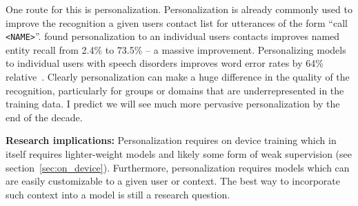 One route for this is personalization. Personalization is already commonly used
to improve the recognition a given users contact list for utterances of the
form ``call \texttt{<NAME>}''. \citet{sim2019personalization} found
personalization to an individual users contacts improves named entity recall
from 2.4\% to 73.5\% -- a massive improvement. Personalizing models to
individual users with speech disorders improves word error rates by 64\%
relative~\citep{sim2019investigation}. Clearly personalization can make a huge
difference in the quality of the recognition, particularly for groups or
domains that are underrepresented in the training data. I predict we will see
much more pervasive personalization by the end of the decade.

{\bf Research implications:} Personalization requires on device training which
in itself requires lighter-weight models and likely some form of weak
supervision (see section~\ref{sec:on_device}). Furthermore, personalization
requires models which can are easily customizable to a given user or context.
The best way to incorporate such context into a model is still a research
question.
